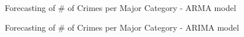 \documentclass[12pt]{beamer}
\begin{document}
        \begin{frame}{Forecasting of \# of Crimes per Major Category - ARMA model}
            \begin{figure}
                \centering
            \end{figure}
        \end{frame}

        \begin{frame}{Forecasting of \# of Crimes per Major Category - ARIMA model}
            \begin{figure}
                \centering
            \end{figure}
        \end{frame}
\end{document}
